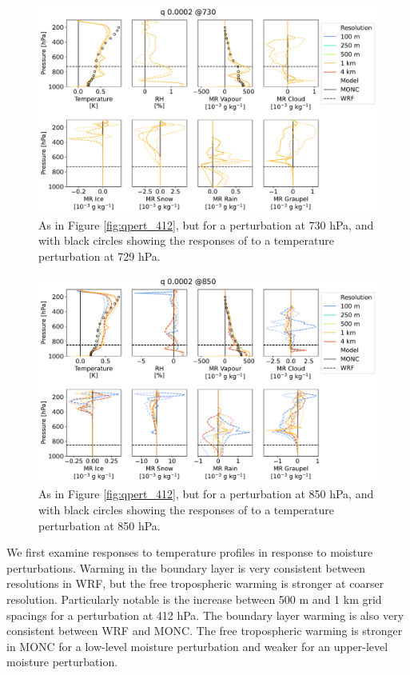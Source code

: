 \documentclass[draft]{agujournal2019}
\begin{document}
\begin{figure}[pth]
    \noindent\includegraphics[width=\textwidth]{figures/pert_diffs_q_0.0002_@730}
    \caption{As in Figure \ref{fig:qpert_412}, but for a perturbation at 730
    hPa, and with black circles showing the responses of 
    to a temperature perturbation at 729 hPa.}
    \label{fig:qpert_730}
\end{figure}

\begin{figure}[pth]
    \noindent\includegraphics[width=\textwidth]{figures/pert_diffs_q_0.0002_@850}
    \caption{As in Figure \ref{fig:qpert_412}, but for a perturbation at 850
    hPa, and with black circles showing the responses of 
    to a temperature perturbation at 850 hPa.}
    \label{fig:qpert_850}
\end{figure}

We first examine responses to temperature profiles in response to moisture
perturbations. Warming in the boundary layer is very consistent between
resolutions in WRF, but the free tropospheric warming is stronger at coarser
resolution. Particularly notable is the increase between 500 m and 1 km grid
spacings for a perturbation at 412 hPa. The boundary layer warming is also very
consistent between WRF and MONC. The free tropospheric warming is stronger in
MONC for a low-level moisture perturbation and weaker for an upper-level
moisture perturbation.
\end{document}
